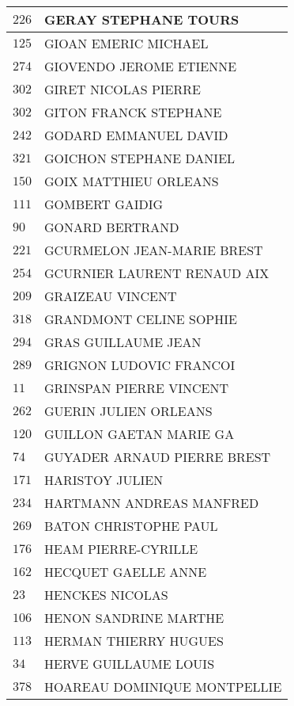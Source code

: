 \begin{xltabular}{\linewidth}{|l|X|}
    \hline
    $226$ & GERAY STEPHANE TOURS \\
    \hline
    $125$ & GIOAN EMERIC MICHAEL \\
    \hline
    $274$ & GIOVENDO JEROME ETIENNE \\
    \hline
    $302$ & GIRET NICOLAS PIERRE \\
    \hline
    $302$ & GITON FRANCK STEPHANE \\
    \hline
    $242$ & GODARD EMMANUEL DAVID \\
    \hline
    $321$ & GOICHON STEPHANE DANIEL \\
    \hline
    $150$ & GOIX MATTHIEU ORLEANS \\
    \hline
    $111$ & GOMBERT GAIDIG \\
    \hline
    $90$ & GONARD BERTRAND \\
    \hline
    $221$ & GCURMELON JEAN-MARIE BREST \\
    \hline
    $254$ & GCURNIER LAURENT RENAUD AIX \\
    \hline
    $209$ & GRAIZEAU VINCENT \\
    \hline
    $318$ & GRANDMONT CELINE SOPHIE \\
    \hline
    $294$ & GRAS GUILLAUME JEAN \\
    \hline
    $289$ & GRIGNON LUDOVIC FRANCOI \\
    \hline
    $11$ & GRINSPAN PIERRE VINCENT \\
    \hline
    $262$ & GUERIN JULIEN ORLEANS \\
    \hline
    $120$ & GUILLON GAETAN MARIE GA \\
    \hline
    $74$ & GUYADER ARNAUD PIERRE BREST \\
    \hline
    $171$ & HARISTOY JULIEN \\
    \hline
    $234$ & HARTMANN ANDREAS MANFRED \\
    \hline
    $269$ & BATON CHRISTOPHE PAUL \\
    \hline
    $176$ & HEAM PIERRE-CYRILLE \\
    \hline
    $162$ & HECQUET GAELLE ANNE \\
    \hline
    $23$ & HENCKES NICOLAS \\
    \hline
    $106$ & HENON SANDRINE MARTHE \\
    \hline
    $113$ & HERMAN THIERRY HUGUES \\
    \hline
    $34$ & HERVE GUILLAUME LOUIS \\
    \hline
    $378$ & HOAREAU DOMINIQUE MONTPELLIE \\

\end{xltabular}
